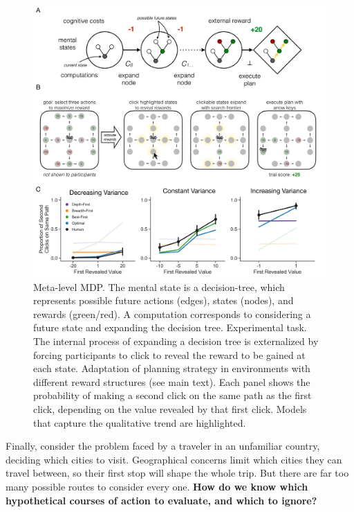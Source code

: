 \documentclass[11pt,a4paperpaper,]{article}
\begin{document}
\begin{figure}[ph]
  \centering
  \includegraphics[width=\textwidth]{diagrams/precis/planning.pdf}
  \caption{
     Meta-level MDP. The mental state is a decision-tree, which represents possible future actions (edges), states (nodes), and rewards (green/red). A computation corresponds to considering a future state and expanding the decision tree.
     Experimental task. The internal process of expanding a decision tree is externalized by forcing participants to click to reveal the reward to be gained at each state.
     Adaptation of planning strategy in environments with different reward structures (see main text). Each panel shows the probability of making a second click on the same path as the first click, depending on the value revealed by that first click. Models that capture the qualitative trend are highlighted. %
  }
  \label{fig:planning}
\end{figure}


Finally, consider the problem faced by a traveler in an unfamiliar country, deciding which cities to visit. Geographical concerns limit which cities they can travel between, so their first stop will shape the whole trip. But there are far too many possible routes to consider every one. \textbf{How do we know which hypothetical courses of action to evaluate, and which to ignore?}
\end{document}
